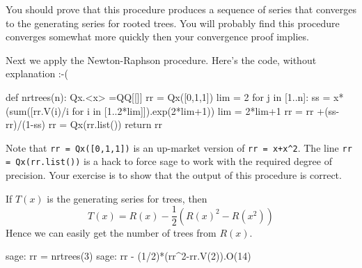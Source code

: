 You should prove that this procedure produces a sequence of
series that converges to the generating series for rooted trees.
You will probably find this procedure converges somewhat more
quickly then your convergence proof implies.

Next we apply the Newton-Raphson procedure.
Here's the code, without explanation :-(
\begin{sageblock}
def nrtrees(n):
    Qx.<x> =QQ[[]]
    rr = Qx([0,1,1])
    lim = 2
    for j in [1..n]:
        ss = x*(sum([rr.V(i)/i for i in [1..2*lim]]).exp(2*lim+1))
        lim = 2*lim+1
        rr = rr +(ss-rr)/(1-ss)
        rr = Qx(rr.list())
    return rr
\end{sageblock}
Note that \verb|rr = Qx([0,1,1])| is an up-market version of \verb|rr = x+x^2|.
The line \verb|rr = Qx(rr.list())| is a hack to force sage to work with the
required degree of precision. Your exercise is to show that the output of this 
procedure is correct.

If $T(x)$ is the generating series for trees, then
\[
    T(x) = R(x) -\frac12(R(x)^2-R(x^2))
\]
Hence we can easily get the number of trees from $R(x)$.

\begin{sageexample}
sage: rr = nrtrees(3)
sage: rr - (1/2)*(rr^2-rr.V(2)).O(14)
\end{sageexample}